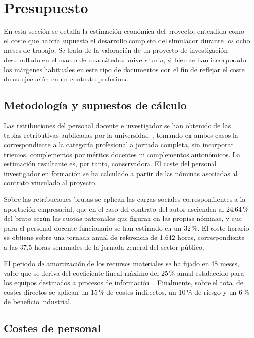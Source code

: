\section{Presupuesto}

En esta sección se detalla la estimación económica del proyecto, entendida como el coste
que habría supuesto el desarrollo completo del simulador durante los ocho meses de
trabajo. Se trata de la valoración de un proyecto de investigación desarrollado en el
marco de una cátedra universitaria, si bien se han incorporado los márgenes habituales
en este tipo de documentos con el fin de reflejar el coste de su ejecución en un contexto
profesional.

\subsection{Metodología y supuestos de cálculo}

Las retribuciones del personal docente e investigador se han obtenido de las tablas
retributivas publicadas por la universidad~\cite{uc3m_retribuciones}, tomando en ambos
casos la correspondiente a la categoría profesional a jornada completa, sin incorporar
trienios, complementos por méritos docentes ni complementos autonómicos. La estimación
resultante es, por tanto, conservadora. El coste del personal investigador en formación se
ha calculado a partir de las nóminas asociadas al contrato vinculado al proyecto.

Sobre las retribuciones brutas se aplican las cargas sociales correspondientes a la
aportación empresarial, que en el caso del contrato del autor ascienden al 24,64\,\% del
bruto según las cuotas patronales que figuran en las propias nóminas, y que para el
personal docente funcionario se han estimado en un 32\,\%. El coste horario se obtiene
sobre una jornada anual de referencia de 1.642 horas, correspondiente a las 37,5 horas
semanales de la jornada general del sector público.

El periodo de amortización de los recursos materiales se ha fijado en 48 meses, valor que
se deriva del coeficiente lineal máximo del 25\,\% anual establecido para los equipos
destinados a procesos de información~\cite{ley27_2014}. Finalmente, sobre el total de
costes directos se aplican un 15\,\% de costes indirectos, un 10\,\% de riesgo y un
6\,\% de beneficio industrial.

\subsection{Costes de personal}

